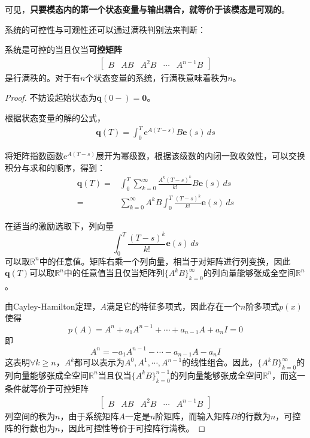 \documentclass{ctexbook}
\begin{document}
可见，\textbf{只要模态内的第一个状态变量与输出耦合，就等价于该模态是可观的}。

系统的可控性与可观性还可以通过满秩判别法来判断：

\begin{theorem}[可控性的满秩判别法]
    系统是可控的当且仅当\textbf{可控矩阵}
    \begin{align*}
    \begin{bmatrix}
    B & AB & A^2B & \cdots & A^{n-1}B
    \end{bmatrix}
    \end{align*}
    是行满秩的。对于有$n$个状态变量的系统，行满秩意味着秩为$n$。
\end{theorem}
\begin{proof}
    不妨设起始状态为$\mathbf{q}(0-)=\mathbf{0}$。

    根据状态变量的解的公式，\begin{align*}
    \mathbf{q}(T)=\int_0^T \mathrm{e}^{A(T-s)}B\mathbf{e}(s)\,ds
    \end{align*}

    将矩阵指数函数$\mathrm{e}^{A(T-s)}$展开为幂级数，根据该级数的内闭一致收敛性，可以交换积分与求和的顺序，得到：\begin{align*}
    \mathbf{q}(T)=&\int_0^T \sum_{k=0}^\infty \frac{A^k(T-s)^k}{k!}B\mathbf{e}(s)\,ds\\
    =&\sum_{k=0}^\infty A^k B\int_0^T \frac{(T-s)^k}{k!} \mathbf{e}(s)\,ds
    \end{align*}

    在适当的激励选取下，列向量
    $$\int_0^T \frac{(T-s)^k}{k!} \mathbf{e}(s)\,ds$$
    可以取$\mathbb{R}^n$中的任意值。矩阵右乘一个列向量，相当于对矩阵进行列变换，因此$\mathbf{q}(T)$可以取$\mathbb{R}^n$中的任意值当且仅当矩阵列$\{A^k B\}_{k=0}^\infty$的列向量能够张成全空间$\mathbb{R}^n$。

    由Cayley-Hamilton定理，$A$满足它的特征多项式，因此存在一个$n$阶多项式$p(x)$使得
    $$p(A)=A^n+a_1 A^{n-1}+\cdots+a_{n-1}A+a_n I=0$$
    即
    $$A^n=-a_1 A^{n-1}-\cdots-a_{n-1}A-a_n I$$
    这表明$\forall k\geq n$，$A^k$都可以表示为$A^0,A^1,\cdots,A^{n-1}$的线性组合。因此，$\{A^k B\}_{k=0}^\infty$的列向量能够张成全空间$\mathbb{R}^n$当且仅当$\{A^k B\}_{k=0}^{n-1}$的列向量能够张成全空间$\mathbb{R}^n$，而这一条件就等价于可控矩阵\begin{align*}
    \begin{bmatrix}
    B & AB & A^2B & \cdots & A^{n-1}B
    \end{bmatrix}
    \end{align*}
    列空间的秩为$n$，由于系统矩阵$A$一定是$n$阶矩阵，而输入矩阵$B$的行数为$n$，可控阵的行数也为$n$，因此可控性等价于可控阵行满秩。
\end{proof}
\end{document}
